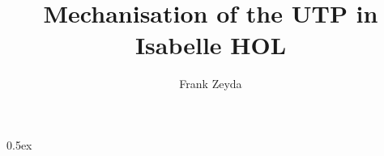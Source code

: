 \documentclass[11pt,a4paper]{article}
\begin{document}
\title{Mechanisation of the UTP in Isabelle HOL}

\author{Frank Zeyda}

\maketitle

\tableofcontents

\newpage

\parindent 0pt\parskip 0.5ex

%



\newpage



\newpage



\newpage



\newpage



\newpage







\newpage



\newpage



\newpage



\newpage



\newpage



\newpage



\newpage



\newpage



\newpage



\newpage



\newpage
\end{document}
